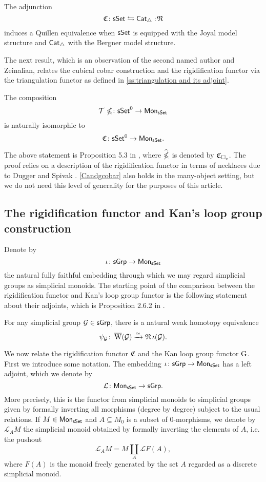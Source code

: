 \begin{proposition} \label{joyalbergner}
	The adjunction
	\[
	\operatorname{\mathfrak{C}} \colon \mathsf{sSet} \leftrightarrows \mathsf{Cat}_{\triangle} :\!\operatorname{\mathfrak{N}}
	\]
	induces a Quillen equivalence when $\mathsf{sSet}$ is equipped with the Joyal model structure and $\mathsf{Cat}_{\triangle}$ with the Bergner model structure.
\end{proposition}

The next result, which is an observation of the second named author and Zeinalian, relates the cubical cobar construction and the rigidification functor via the triangulation functor as defined in \cref{ss:triangulation and its adjoint}.

\begin{proposition} \label{Candgcobar}
	The composition
	\[
	\operatorname{\mathcal{T}} \, \operatorname{\mathbb{\Omega}} \colon \mathsf{sSet}^0 \to \mathsf{Mon}_{\mathsf{sSet}}
	\]
	is naturally isomorphic to
	\[
	\operatorname{\mathfrak{C}} \colon \mathsf{sSet}^0 \to \mathsf{Mon}_{\mathsf{sSet}}.
	\]
\end{proposition}

The above statement is Proposition 5.3 in \cite{rivera2018cubical}, where $\operatorname{\widehat{\mathbb{\Omega}}}$ is denoted by $\operatorname{\mathfrak{C}}_{\square_c}$.
The proof relies on a description of the rigidification functor in terms of necklaces due to Dugger and Spivak \cite{dugger2011rigidification}.
\cref{Candgcobar} also holds in the many-object setting, but we do not need this level of generality for the purposes of this article.

\subsection{The rigidification functor and Kan's loop group construction}

Denote by
\[
\iota \colon \mathsf{sGrp} \to \mathsf{Mon}_{\mathsf{sSet}}
\]
the natural fully faithful embedding through which we may regard simplicial groups as simplicial monoids.
The starting point of the comparison between the rigidification functor and Kan's loop group functor is the following statement about their adjoints, which is Proposition 2.6.2 in \cite{hinich2007deformation}.

\begin{proposition} \label{p:hinich}
	For any simplicial group $\mathcal{G} \in \mathsf{sGrp}$, there is a natural weak homotopy equivalence
	\[
	\psi_{\mathcal{G}} \colon \operatorname{\overline{W}}(\mathcal{G}) \xrightarrow{\simeq} \operatorname{\mathfrak{N}}\iota(\mathcal{G}).
	\]
\end{proposition}

We now relate the rigidification functor $\operatorname{\mathfrak{C}}$ and the Kan loop group functor $\operatorname{G}$.
First we introduce some notation.
The embedding $\iota \colon \mathsf{sGrp} \to \mathsf{Mon}_{\mathsf{sSet}}$ has a left adjoint, which we denote by
\[
\mathcal{L} \colon \mathsf{Mon}_{\mathsf{sSet}} \to \mathsf{sGrp}.
\]
More precisely, this is the functor from simplicial monoids to simplicial groups given by formally inverting all morphisms (degree by degree) subject to the usual relations.
If $M \in \mathsf{Mon}_{\mathsf{sSet}}$ and $A \subseteq M_0$ is a subset of $0$-morphisms, we denote by $\mathcal{L}_AM$ the simplicial monoid obtained by formally inverting the elements of $A$, i.e. the pushout
\[
\mathcal{L}_AM= M \coprod_A \mathcal{L}F(A),
\]
where $F(A)$ is the monoid freely generated by the set $A$ regarded as a discrete simplicial monoid.

